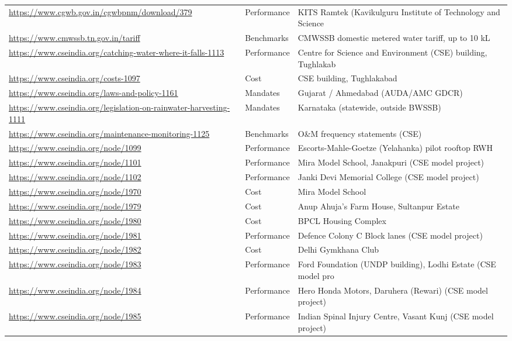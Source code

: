 {\begin{longtable}{p{9.2cm} p{2.5cm} p{4.2cm}}
\url{https://www.cgwb.gov.in/cgwbpnm/download/379} & Performance & KITS Ramtek (Kavikulguru Institute of Technology and Science\\
\url{https://www.cmwssb.tn.gov.in/tariff} & Benchmarks & CMWSSB domestic metered water tariff, up to 10 kL\\
\url{https://www.cseindia.org/catching-water-where-it-falls-1113} & Performance & Centre for Science and Environment (CSE) building, Tughlakab\\
\url{https://www.cseindia.org/costs-1097} & Cost & CSE building, Tughlakabad\\
\url{https://www.cseindia.org/laws-and-policy-1161} & Mandates & Gujarat / Ahmedabad (AUDA/AMC GDCR)\\
\url{https://www.cseindia.org/legislation-on-rainwater-harvesting-1111} & Mandates & Karnataka (statewide, outside BWSSB)\\
\url{https://www.cseindia.org/maintenance-monitoring-1125} & Benchmarks & O\&M frequency statements (CSE)\\
\url{https://www.cseindia.org/node/1099} & Performance & Escorts-Mahle-Goetze (Yelahanka) pilot rooftop RWH\\
\url{https://www.cseindia.org/node/1101} & Performance & Mira Model School, Janakpuri (CSE model project)\\
\url{https://www.cseindia.org/node/1102} & Performance & Janki Devi Memorial College (CSE model project)\\
\url{https://www.cseindia.org/node/1970} & Cost & Mira Model School\\
\url{https://www.cseindia.org/node/1979} & Cost & Anup Ahuja's Farm House, Sultanpur Estate\\
\url{https://www.cseindia.org/node/1980} & Cost & BPCL Housing Complex\\
\url{https://www.cseindia.org/node/1981} & Performance & Defence Colony C Block lanes (CSE model project)\\
\url{https://www.cseindia.org/node/1982} & Cost & Delhi Gymkhana Club\\
\url{https://www.cseindia.org/node/1983} & Performance & Ford Foundation (UNDP building), Lodhi Estate (CSE model pro\\
\url{https://www.cseindia.org/node/1984} & Performance & Hero Honda Motors, Daruhera (Rewari) (CSE model project)\\
\url{https://www.cseindia.org/node/1985} & Performance & Indian Spinal Injury Centre, Vasant Kunj (CSE model project)\\

\end{longtable}}
